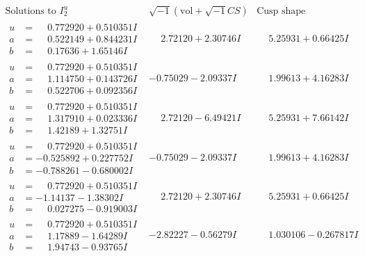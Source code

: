 \documentclass[1p]{elsarticle_modified}
\theoremstyle{definition}
\newcommand{\I}{\sqrt{-1}}
\begin{document}
$$\begin{array}{c|c|c}  
\text{Solutions to }I^u_{2}& \I (\text{vol} + \sqrt{-1}CS) & \text{Cusp shape}\\
 \hline 
\begin{aligned}
u &= \phantom{-}0.772920 + 0.510351 I \\
a &= \phantom{-}0.522149 + 0.844231 I \\
b &= \phantom{-}0.17636 + 1.65146 I\end{aligned}
 & \phantom{-}2.72120 + 2.30746 I & \phantom{-}5.25931 + 0.66425 I \\ \hline\begin{aligned}
u &= \phantom{-}0.772920 + 0.510351 I \\
a &= \phantom{-}1.114750 + 0.143726 I \\
b &= \phantom{-}0.522706 + 0.092356 I\end{aligned}
 & -0.75029 - 2.09337 I & \phantom{-}1.99613 + 4.16283 I \\ \hline\begin{aligned}
u &= \phantom{-}0.772920 + 0.510351 I \\
a &= \phantom{-}1.317910 + 0.023336 I \\
b &= \phantom{-}1.42189 + 1.32751 I\end{aligned}
 & \phantom{-}2.72120 - 6.49421 I & \phantom{-}5.25931 + 7.66142 I \\ \hline\begin{aligned}
u &= \phantom{-}0.772920 + 0.510351 I \\
a &= -0.525892 + 0.227752 I \\
b &= -0.788261 - 0.680002 I\end{aligned}
 & -0.75029 - 2.09337 I & \phantom{-}1.99613 + 4.16283 I \\ \hline\begin{aligned}
u &= \phantom{-}0.772920 + 0.510351 I \\
a &= -1.14137 - 1.38302 I \\
b &= \phantom{-}0.027275 - 0.919003 I\end{aligned}
 & \phantom{-}2.72120 + 2.30746 I & \phantom{-}5.25931 + 0.66425 I \\ \hline\begin{aligned}
u &= \phantom{-}0.772920 + 0.510351 I \\
a &= \phantom{-}1.17889 - 1.64289 I \\
b &= \phantom{-}1.94743 - 0.93765 I\end{aligned}
 & -2.82227 - 0.56279 I & \phantom{-}1.030106 - 0.267817 I \\ \hline\begin{aligned}

\end{aligned}
\end{array}$$
\end{document}
